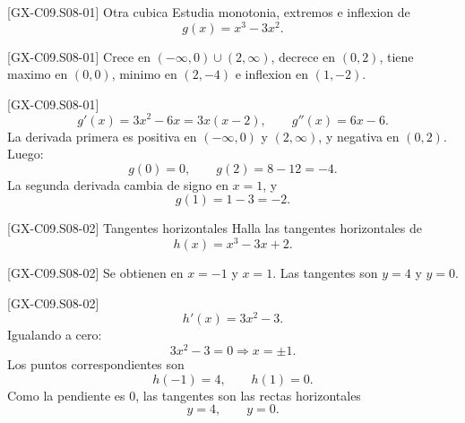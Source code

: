 \begin{guidedexercise}{[GX-C09.S08-01] Otra cubica}
Estudia monotonia, extremos e inflexion de
\[
g(x)=x^3-3x^2.
\]
\end{guidedexercise}

\begin{shortanswer}{[GX-C09.S08-01]}
Crece en \((-\infty,0)\cup(2,\infty)\), decrece en \((0,2)\), tiene maximo en \((0,0)\),
minimo en \((2,-4)\) e inflexion en \((1,-2)\).
\end{shortanswer}

\begin{fullsolution}{[GX-C09.S08-01]}
\[
g'(x)=3x^2-6x=3x(x-2),\qquad g''(x)=6x-6.
\]
La derivada primera es positiva en \((-\infty,0)\) y \((2,\infty)\), y negativa en \((0,2)\).
Luego:
\[
g(0)=0,\qquad g(2)=8-12=-4.
\]
La segunda derivada cambia de signo en \(x=1\), y
\[
g(1)=1-3=-2.
\]
\end{fullsolution}

\begin{guidedexercise}{[GX-C09.S08-02] Tangentes horizontales}
Halla las tangentes horizontales de
\[
h(x)=x^3-3x+2.
\]
\end{guidedexercise}

\begin{shortanswer}{[GX-C09.S08-02]}
Se obtienen en \(x=-1\) y \(x=1\). Las tangentes son \(y=4\) y \(y=0\).
\end{shortanswer}

\begin{fullsolution}{[GX-C09.S08-02]}
\[
h'(x)=3x^2-3.
\]
Igualando a cero:
\[
3x^2-3=0 \Longrightarrow x=\pm 1.
\]
Los puntos correspondientes son
\[
h(-1)=4,\qquad h(1)=0.
\]
Como la pendiente es \(0\), las tangentes son las rectas horizontales
\[
y=4,\qquad y=0.
\]
\end{fullsolution}

